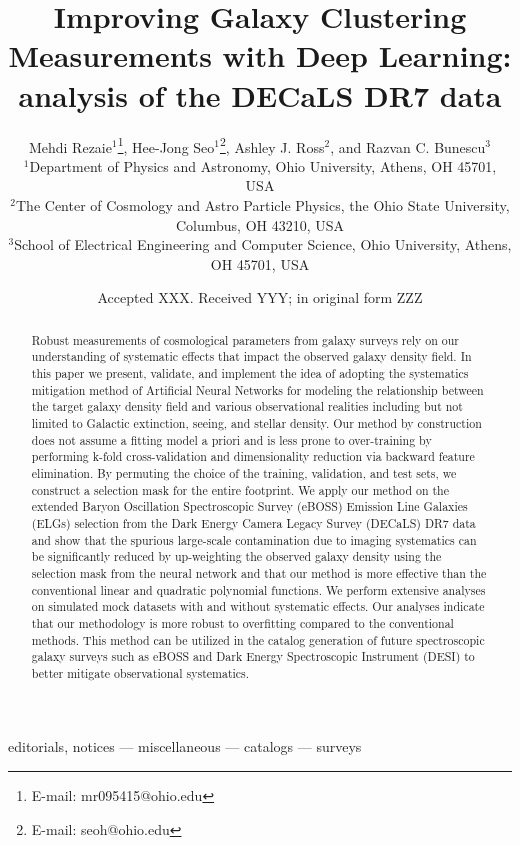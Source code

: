 \documentclass[fleqn, usenatbib]{mnras}
\title[Improving Galaxy Clustering with Deep Learning]{Improving Galaxy Clustering Measurements with Deep Learning: analysis of the DECaLS DR7 data}
\author[M. Rezaie et al.]{
Mehdi Rezaie$^{1}$\thanks{E-mail: mr095415@ohio.edu},
Hee-Jong Seo$^{1}$\thanks{E-mail: seoh@ohio.edu},
Ashley J. Ross$^{2}$,
and Razvan C. Bunescu$^{3}$
\\
$^{1}$Department of Physics and Astronomy, Ohio University, Athens, OH 45701, USA\\
$^{2}$The Center of Cosmology and Astro Particle Physics, the Ohio State University, Columbus, OH 43210, USA\\
$^{3}$School of Electrical Engineering and Computer Science, Ohio University, Athens, OH 45701, USA
}
\date{Accepted XXX. Received YYY; in original form ZZZ}
\begin{document}
\label{firstpage}
\pagerange{\pageref{firstpage}--\pageref{lastpage}}
\maketitle


\begin{abstract}
Robust measurements of cosmological parameters from galaxy surveys rely on our understanding of systematic effects that impact the observed galaxy density field. In this paper we present, validate, and implement the idea of adopting the systematics mitigation method of Artificial Neural Networks for modeling the relationship between the target galaxy density field and various observational realities including but not limited to Galactic extinction, seeing, and stellar density. Our method by construction does not assume a fitting model a priori and is less prone to over-training by performing k-fold cross-validation and dimensionality reduction via backward feature elimination. By permuting the choice of the training, validation, and test sets, we construct a selection mask for the entire footprint.  We apply our method on the extended Baryon Oscillation Spectroscopic Survey (eBOSS) Emission Line Galaxies (ELGs) selection from the Dark Energy Camera Legacy Survey (DECaLS) DR7 data and show that the spurious large-scale contamination due to imaging systematics can be significantly reduced by up-weighting the observed galaxy density using the selection mask from the neural network and that our method is more effective than the conventional linear and quadratic polynomial functions.  We perform extensive analyses on simulated mock datasets with and without systematic effects. Our analyses indicate that our methodology is more robust to overfitting compared to the conventional methods. This method can be utilized in the catalog generation of future spectroscopic galaxy surveys such as eBOSS and Dark Energy Spectroscopic Instrument (DESI) to better mitigate observational systematics.
\end{abstract}

\begin{keywords}
editorials, notices --- 
miscellaneous --- catalogs --- surveys
\end{keywords}

%
%
\end{document}
